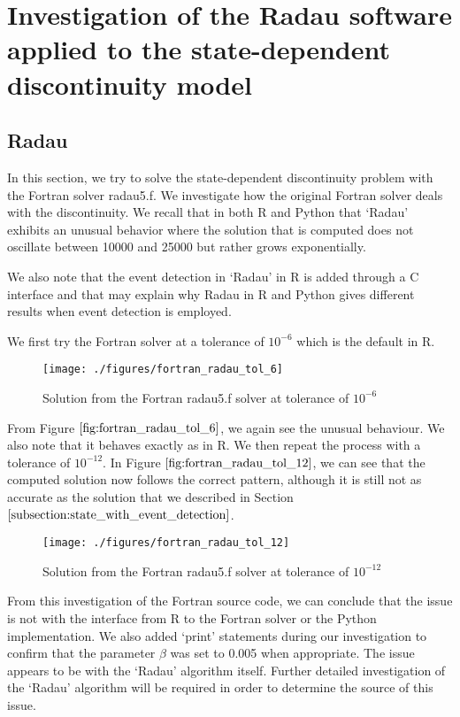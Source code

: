 
\section{Investigation of the Radau software applied to the state-dependent discontinuity model}
\label{section:fortran_inaccuracies}
\subsection{Radau}
In this section, we try to solve the state-dependent discontinuity problem with the Fortran solver radau5.f. We investigate how the original Fortran solver deals with the discontinuity. We recall that in both R and Python that `Radau' exhibits an unusual behavior where the solution that is computed does not oscillate between 10000 and 25000 but rather grows exponentially. 

We also note that the event detection in `Radau' in R is added through a C interface and that may explain why Radau in R and Python gives different results when event detection is employed.

We first try the Fortran solver at a tolerance of $10^{-6}$ which is the default in R.
\begin{figure}[h]
\centering
\texttt{[image: ./figures/fortran\_radau\_tol\_6]}
\caption{Solution from the Fortran radau5.f solver at tolerance of $10^{-6}$}
\label{fig:fortran_radau_tol_6}
\end{figure}

From Figure $\ref{fig:fortran_radau_tol_6}$, we again see the unusual behaviour. We also note that it behaves exactly as in R. We then repeat the process with a tolerance of $10^{-12}$. In Figure $\ref{fig:fortran_radau_tol_12}$, we can see that the computed solution now follows the correct pattern, although it is still not as accurate as the solution that we described in Section $\ref{subsection:state_with_event_detection}$.

\begin{figure}[h]
\centering
\texttt{[image: ./figures/fortran\_radau\_tol\_12]}
\caption{Solution from the Fortran radau5.f solver at tolerance of $10^{-12}$}
\label{fig:fortran_radau_tol_12}
\end{figure}

From this investigation of the Fortran source code, we can conclude that the issue is not with the interface from R to the Fortran solver or the Python implementation. We also added `print' statements during our investigation to confirm that the parameter $\beta$ was set to 0.005 when appropriate. The issue appears to be with the `Radau' algorithm itself. Further detailed investigation of the `Radau' algorithm will be required in order to determine the source of this issue.
